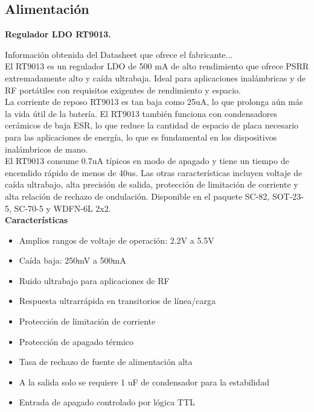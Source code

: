 \subsection{Alimentación}

\textbf{Regulador LDO RT9013.}\newline

Información obtenida del Datasheet que ofrece el fabricante...\\

El RT9013 es un regulador LDO de 500 mA de alto rendimiento que ofrece PSRR extremadamente alto y caída ultrabaja. Ideal para aplicaciones inalámbricas y de RF portátiles con requisitos exigentes de rendimiento y espacio.\\

La corriente de reposo RT9013 es tan baja como 25uA, lo que prolonga aún más la vida útil de la batería. El RT9013 también funciona con condensadores cerámicos de baja ESR, lo que reduce la cantidad de espacio de placa necesario para las aplicaciones de energía, lo que es fundamental en los dispositivos inalámbricos de mano.\\

El RT9013 consume 0.7uA típicos en modo de apagado y tiene un tiempo de encendido rápido de menos de 40us. Las otras características incluyen voltaje de caída ultrabajo, alta precisión de salida, protección de limitación de corriente y alta relación de rechazo de ondulación. Disponible en el paquete SC-82, SOT-23-5, SC-70-5 y WDFN-6L 2x2.\\

\textbf{Características}

\begin{itemize}
    \item Amplios rangos de voltaje de operación: 2.2V a 5.5V
    \item Caída baja: 250mV a 500mA
    \item Ruido ultrabajo para aplicaciones de RF
    \item Respuesta ultrarrápida en transitorios de línea/carga
    \item Protección de limitación de corriente
    \item Protección de apagado térmico
    \item Tasa de rechazo de fuente de alimentación alta
    \item A la salida solo se requiere 1 uF de condensador para la estabilidad
    \item Entrada de apagado controlado por lógica TTL
\end{itemize}


